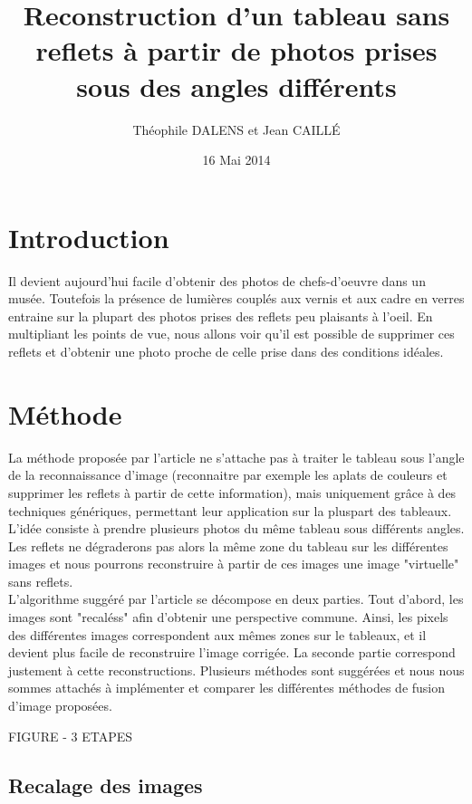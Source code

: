 \documentclass[12pt,a4paper]{article}
\title{Reconstruction d'un tableau sans reflets à partir de photos prises sous des angles différents}
\date{16 Mai 2014}
\author{Théophile DALENS et Jean CAILLÉ}
\begin{document}
\maketitle

\section{Introduction}
Il devient aujourd'hui facile d'obtenir des photos de chefs-d'oeuvre dans un musée. Toutefois la présence de lumières couplés aux vernis et aux cadre en verres entraine sur la plupart des photos prises des reflets peu plaisants à l'oeil. En multipliant les points de vue, nous allons voir qu'il est possible de supprimer ces reflets et d'obtenir une photo proche de celle prise dans des conditions idéales.

\section{Méthode}

La méthode proposée par l'article ne s'attache pas à traiter le tableau sous l'angle de la reconnaissance d'image (reconnaitre par exemple les aplats de couleurs et supprimer les reflets à partir de cette information), mais uniquement grâce à des techniques génériques, permettant leur application sur la pluspart des tableaux. L'idée consiste à prendre plusieurs photos du même tableau sous différents angles. Les reflets ne dégraderons pas alors la même zone du tableau sur les différentes images et nous pourrons reconstruire à partir de ces images une image "virtuelle" sans reflets.\\

L'algorithme suggéré par l'article se décompose en deux parties. Tout d'abord, les images sont "recaléss" afin d'obtenir une perspective commune. Ainsi, les pixels des différentes images correspondent aux mêmes zones sur le tableaux, et il devient plus facile de reconstruire l'image corrigée. La seconde partie correspond justement à cette reconstructions. Plusieurs méthodes sont suggérées et nous nous sommes attachés à implémenter et comparer les différentes méthodes de fusion d'image proposées.

FIGURE - 3 ETAPES

\subsection{Recalage des images}
\end{document}
